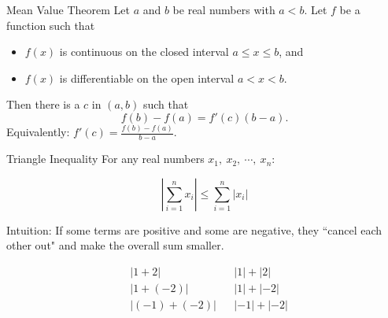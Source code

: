  \begin{frame}[t]
\begin{center}
\end{center}\vfill

 
\begin{block}{Mean Value Theorem}
Let $a$ and $b$ be real numbers with $a<b$. Let $f$ be a function such that
\begin{itemize}
\item $f(x)$ is continuous on the closed interval $a \le x \le b$, and
\item $f(x)$ is differentiable on the open interval $a<x<b$.
\end{itemize}
Then there is a $c$ in $(a,b)$ such that
\[ f(b)-f(a) = f'(c)(b-a).\]\pause
Equivalently: $f'(c)=\frac{f(b)-f(a)}{b-a}$.
\end{block}

\end{frame}
\begin{frame}
\AnswerSpace
{}

\begin{block}{Triangle Inequality}%
For any real numbers $x_1,~x_2,~\cdots,~x_n$:

\[\left|\sum_{i=1}^n x_i \right|\leq \sum_{i=1}^n |x_i|\]
\end{block}
Intuition: If some terms are positive and some are negative, they ``cancel each other out" and make the overall sum smaller.
\pause\vfill

\begin{align*}
&|1+2|   &&|1|+|2|\\[1.5em]
&|1+(-2)|  && |1|+|-2| \\[1.5em]
&|(-1)+(-2)|  && |-1|+|-2| 
\end{align*}


\end{frame}
